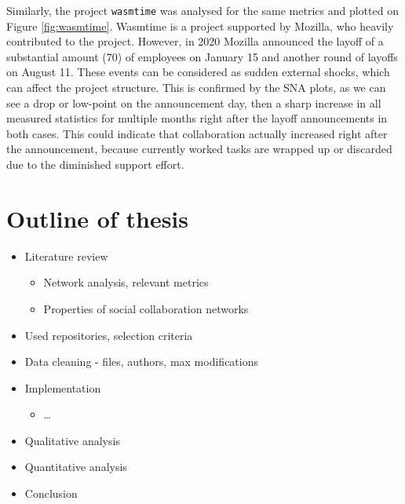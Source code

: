 Similarly, the project \texttt{wasmtime} was analysed for the same metrics and plotted on Figure \ref{fig:wasmtime}. Wasmtime is a project supported by Mozilla, who heavily contributed to the project. However, in 2020 Mozilla announced the layoff of a substantial amount (70) of employees on January 15 and another round of layoffs on August 11. These events can be considered as sudden external shocks, which can affect the project structure. This is confirmed by the SNA plots, as we can see a drop or low-point on the announcement day, then a sharp increase in all measured statistics for multiple months right after the layoff announcements in both cases. This could indicate that collaboration actually increased right after the announcement, because currently worked tasks are wrapped up or discarded due to the diminished support effort. \\




\section{Outline of thesis}
\begin{itemize}
    \item Literature review
    \begin{itemize}
        \item Network analysis, relevant metrics
        \item Properties of social collaboration networks
    \end{itemize}
    \item Used repositories, selection criteria
    \item Data cleaning - files, authors, max modifications
    \item Implementation
    \begin{itemize}
        \item \dots
    \end{itemize}
    \item Qualitative analysis
    \item Quantitative analysis
    \item Conclusion
\end{itemize}

